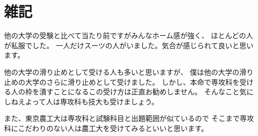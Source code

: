 \documentclass[]{jsarticle}
\begin{document}
\section*{雑記}
    他の大学の受験と比べて当たり前ですがみんなホーム感が強く、
    ほとんどの人が私服でした。
    一人だけスーツの人がいました。気合が感じられて良いと思います。

    他の大学の滑り止めとして受ける人も多いと思いますが、
    僕は他の大学の滑り止めの大学のさらに滑り止めとして受けました。
    しかし、本命で専攻科を受ける人の枠を潰すことになるこの受け方は正直お勧めしません。
    そんなこと気にしねえよって人は専攻科も技大も受けましょう。

    また、東京農工大は専攻科と試験科目と出題範囲が似ているので
    そこまで専攻科にこだわりのない人は農工大を受けてみるといいと思います。
\end{document}
